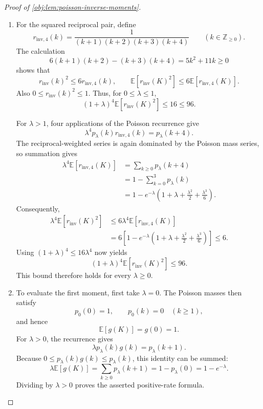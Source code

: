 \begin{proof}[Proof of \cref{obj:lem:poisson-inverse-moments}]
\begin{enumerate}
\item For the squared reciprocal pair, define
\[
r_{\mathrm{inv},4}(k)
=\frac1{(k+1)(k+2)(k+3)(k+4)}
\qquad(k\in\mathbb Z_{\ge0}).
\]
The calculation
\[
6(k+1)(k+2)-(k+3)(k+4)=5k^2+11k\ge0
\]
shows that
\[
r_{\mathrm{inv}}(k)^2\le6r_{\mathrm{inv},4}(k),
\qquad
\mathbb E[r_{\mathrm{inv}}(K)^2]
\le6\mathbb E[r_{\mathrm{inv},4}(K)].
\]
Also \(0\le r_{\mathrm{inv}}(k)^2\le1\). Thus, for \(0\le\lambda\le1\),
\[
(1+\lambda)^4\mathbb E[r_{\mathrm{inv}}(K)^2]
\le16\le96.
\]

For \(\lambda>1\), four applications of the Poisson recurrence give
\[
\lambda^4p_\lambda(k)r_{\mathrm{inv},4}(k)=p_\lambda(k+4).
\]
The reciprocal-weighted series is again dominated by the Poisson mass series, so summation gives
\[
\begin{aligned}
\lambda^4\mathbb E[r_{\mathrm{inv},4}(K)]
&=\sum_{k\ge0}p_\lambda(k+4)\\
&=1-\sum_{k=0}^{3}p_\lambda(k)\\
&=1-e^{-\lambda}
\left(1+\lambda+\frac{\lambda^2}{2}+\frac{\lambda^3}{6}\right).
\end{aligned}
\]
Consequently,
\[
\begin{aligned}
\lambda^4\mathbb E[r_{\mathrm{inv}}(K)^2]
&\le6\lambda^4\mathbb E[r_{\mathrm{inv},4}(K)]\\
&=6\left[
1-e^{-\lambda}
\left(1+\lambda+\frac{\lambda^2}{2}+\frac{\lambda^3}{6}\right)
\right]
\le6.
\end{aligned}
\]
Using \((1+\lambda)^4\le16\lambda^4\) now yields
\[
(1+\lambda)^4\mathbb E[r_{\mathrm{inv}}(K)^2]\le96.
\]
This bound therefore holds for every \(\lambda\ge0\). %

\item To evaluate the first moment, first take \(\lambda=0\). The Poisson masses then satisfy
\[
p_0(0)=1,\qquad p_0(k)=0\quad(k\ge1),
\]
and hence
\[
\mathbb E[g(K)]=g(0)=1.
\]
For \(\lambda>0\), the recurrence gives
\[
\lambda p_\lambda(k)g(k)=p_\lambda(k+1).
\]
Because \(0\le p_\lambda(k)g(k)\le p_\lambda(k)\), this identity can be summed:
\[
\lambda\mathbb E[g(K)]
=\sum_{k\ge0}p_\lambda(k+1)
=1-p_\lambda(0)
=1-e^{-\lambda}.
\]
Dividing by \(\lambda>0\) proves the asserted positive-rate formula. %


\end{enumerate}
\end{proof}
